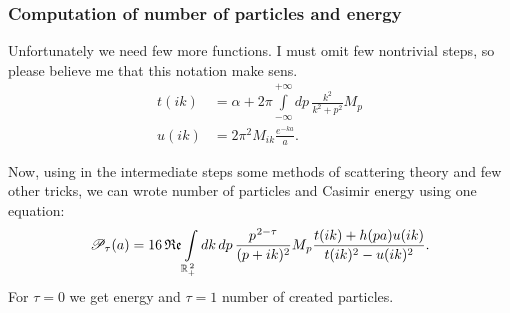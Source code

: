 \documentclass[10pt,t]{beamer}
\begin{document}
\begin{frame}
  \frametitle{Computation of number of particles and energy}



  Unfortunately we need few more functions. I must omit few nontrivial
  steps, so please believe me that this notation make sens.
  \begin{align}
    \label{eq:Epstein-Glaser-24-A}
    t( i k )
    &=
      \alpha + 2\pi \int\limits_{ -\infty }^{ +\infty } dp \,
      \frac{ k^{ 2 } }{ k^{ 2 } + p^{ 2 } } M_{ p } \\
    u( i k )
    &=
      2\pi^{ 2 } M_{ i k } \frac{ e^{ -ka } }{ a }.
  \end{align}

  \vspace{-1em}



  Now, using in the intermediate steps some methods of scattering theory
  and few other tricks, we can wrote number of particles and Casimir
  energy using one equation:
  \begin{equation}
    \label{eq:Energia-i-liczba-czastek-dla-modelu-ETC-31}
    \mathcal{P}_{ \tau }( a ) =
    16 \operatorname{\mathfrak{Re}} \int\limits_{ \mathbb{R}_{ + }^{ \, 2 } } dk \, dp \,
    \frac{ p^{ \hspace{0.05em} 2 - \tau } }{ ( p + i k )^{ 2 } } M_{ \hspace{0.05em} p }
    \frac{ t( i k ) + h( p a ) u( i k ) }{ t( i k )^{ 2 } - u( i k )^{ 2 } }.
  \end{equation}
  For $\tau = 0$ we get energy and $\tau = 1$ number of created particles.

\end{frame}
\end{document}

